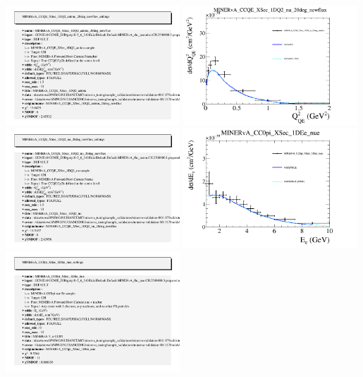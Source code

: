 \documentclass{article}
\begin{document}
\includegraphics[width=0.49\textwidth]{figures/nuisance_MINERvA_CCQE_XSec_1DQ2_antinu_20deg_newflux_info.png}
\centering
\includegraphics[width=0.49\textwidth]{figures/nuisance_MINERvA_CCQE_XSec_1DQ2_nu_20deg_newflux_comp.png}
\includegraphics[width=0.49\textwidth]{figures/nuisance_MINERvA_CCQE_XSec_1DQ2_nu_20deg_newflux_info.png}
\centering
\includegraphics[width=0.49\textwidth]{figures/nuisance_MINERvA_CC0pi_XSec_1DEe_nue_comp.png}
\includegraphics[width=0.49\textwidth]{figures/nuisance_MINERvA_CC0pi_XSec_1DEe_nue_info.png}
\end{document}
